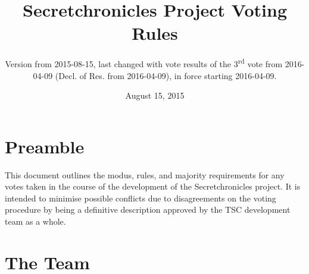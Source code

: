 \documentclass[10pt,a4paper,DIV=calc,headings=medium,twocolumn,final]{scrartcl}
\begin{document}
\title{Secretchronicles Project Voting Rules}
\subtitle{Version from 2015-08-15, last changed with vote results
  of the 3\textsuperscript{rd} vote from 2016-04-09
  (Decl. of Res. from 2016-04-09), in force starting 2016-04-09.}
\date{August 15, 2015}
\maketitle{}

\section*{Preamble}

This document outlines the modus, rules, and majority requirements for
any votes taken in the course of the development of the
Secretchronicles project. It is intended to minimise possible
conflicts due to disagreements on the voting procedure by being a
definitive description approved by the TSC development team as a
whole.

\section{The Team}
\end{document}
